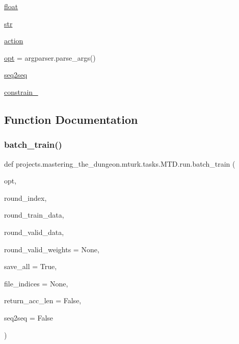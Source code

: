 \begin{DoxyCompactItemize}
\item 
\hyperlink{namespaceprojects_1_1mastering__the__dungeon_1_1mturk_1_1tasks_1_1MTD_1_1run_a2b2eac696023a001430f5e711592c0d9}{float}
\item 
\hyperlink{namespaceprojects_1_1mastering__the__dungeon_1_1mturk_1_1tasks_1_1MTD_1_1run_a6289bcc1c9938537f4b6fc4283868a53}{str}
\item 
\hyperlink{namespaceprojects_1_1mastering__the__dungeon_1_1mturk_1_1tasks_1_1MTD_1_1run_a4c97e66fe88390114c31d1916192cb95}{action}
\item 
\hyperlink{namespaceprojects_1_1mastering__the__dungeon_1_1mturk_1_1tasks_1_1MTD_1_1run_a9bc5bb7f931e20fd8bad9fbad46b6886}{opt} = argparser.\+parse\+\_\+args()
\item 
\hyperlink{namespaceprojects_1_1mastering__the__dungeon_1_1mturk_1_1tasks_1_1MTD_1_1run_acae9db44a348a4b21fda3b408f0cb7d9}{seq2seq}
\item 
\hyperlink{namespaceprojects_1_1mastering__the__dungeon_1_1mturk_1_1tasks_1_1MTD_1_1run_a58ed2597b635cdea32b478602c3734fc}{constrain\+\_\+}
\end{DoxyCompactItemize}


\subsection{Function Documentation}
\mbox{\label{namespaceprojects_1_1mastering__the__dungeon_1_1mturk_1_1tasks_1_1MTD_1_1run_a1b5b55764d0ead5087efdcc429514c3e}} 
\subsubsection{\texorpdfstring{batch\+\_\+train()}{batch\_train()}}
{\footnotesize\ttfamily def projects.\+mastering\+\_\+the\+\_\+dungeon.\+mturk.\+tasks.\+M\+T\+D.\+run.\+batch\+\_\+train (\begin{DoxyParamCaption}\item[{}]{opt,  }\item[{}]{round\+\_\+index,  }\item[{}]{round\+\_\+train\+\_\+data,  }\item[{}]{round\+\_\+valid\+\_\+data,  }\item[{}]{round\+\_\+valid\+\_\+weights = {\ttfamily None},  }\item[{}]{save\+\_\+all = {\ttfamily True},  }\item[{}]{file\+\_\+indices = {\ttfamily None},  }\item[{}]{return\+\_\+acc\+\_\+len = {\ttfamily False},  }\item[{}]{seq2seq = {\ttfamily False} }\end{DoxyParamCaption})}


